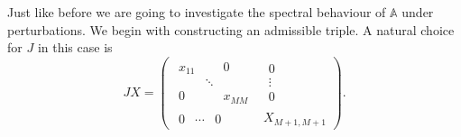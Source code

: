 \documentclass[a4paper]{article}
\theoremstyle{definition}
\begin{document}
Just like before we are going to investigate
    the spectral behaviour of \( \mathbb{A} \) under perturbations.
We begin with constructing an admissible triple.
A natural choice for \( J \) in this case is
\[
        J X =
        \left(\begin{array}{c|c}
            \begin{matrix}
                x_{11} &  & 0 \\
                 & \ddots &  \\
                0 &  & x_{MM}
            \end{matrix} &
            \begin{matrix}
                0 \\
                \vdots \\
                0
            \end{matrix} \\ \hline
            \begin{matrix}
                0 & \cdots & 0
            \end{matrix} &
            X_{M+1,M+1}
        \end{array}\right).
\]
\end{document}
